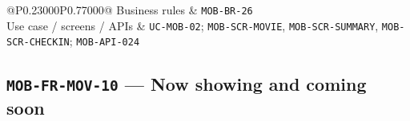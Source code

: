 \begin{longtable}{@{}P{0.23000\SRSWidth}P{0.77000\SRSWidth}@{}}
Business rules & \texttt{MOB-\allowbreak{}BR-\allowbreak{}26} \\[3pt]
Use case /\allowbreak{} screens /\allowbreak{} APIs & \texttt{UC-\allowbreak{}MOB-\allowbreak{}02}; \texttt{MOB-\allowbreak{}SCR-\allowbreak{}MOVIE}, \texttt{MOB-\allowbreak{}SCR-\allowbreak{}SUMMARY}, \texttt{MOB-\allowbreak{}SCR-\allowbreak{}CHECKIN}; \texttt{MOB-\allowbreak{}API-\allowbreak{}024} \\[3pt]
\end{longtable}
\endgroup

\subsection{\texttt{MOB-\allowbreak{}FR-\allowbreak{}MOV-\allowbreak{}10} — Now showing and coming soon}
\begingroup
\fontsize{9.5}{12}\selectfont
\setlength{\SRSWidth}{\dimexpr\linewidth-2\tabcolsep\relax}
